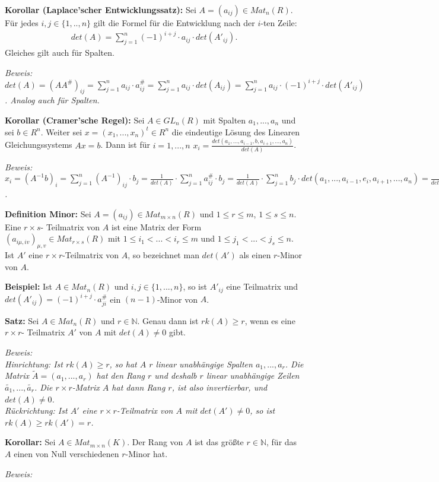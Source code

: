 \documentclass[11pt]{article}
\begin{document}
		\begin{mdframed}[backgroundcolor=blue!20]
			\textbf{Korollar (Laplace'scher Entwicklungssatz):} Sei $A=(a_{ij})\in Mat_n(R)$. Für jedes $i,j\in \{1,..,n\}$ gilt die 
			Formel für die Entwicklung nach der $i$-ten Zeile: \\
			\begin{align*}det(A)=\sum\limits_{j=1}^n (-1)^{i+j}\cdot a_{ij}\cdot det(A'_{ij}).\end{align*}
			Gleiches gilt auch für Spalten.
		\end{mdframed}
		\textit{Beweis: \\
		$det(A)=(AA^\#)_{ij}=\sum\limits_{j=1}^n a_{ij}\cdot a^\#_{ij} = \sum\limits_{j=1}^n a_{ij}\cdot det(A_{ij})=\sum\limits_
		{j=1}^n a_{ij}\cdot (-1)^{i+j}\cdot det(A'_{ij})$. Analog auch für Spalten.}
		
		\begin{mdframed}[backgroundcolor=blue!20]
			\textbf{Korollar (Cramer'sche Regel):} Sei $A\in GL_n(R)$ mit Spalten $a_1,...,a_n$ und sei $b\in R^n$. Weiter sei 
			$x=(x_1,...,x_n)^t\in R^n$ die eindeutige Lösung des Linearen Gleichungssystems $Ax=b$. Dann ist für $i=1,...,n$ 
			$x_i=\frac{det(a_1,...,a_{i-1},b,a_{i+1},...,a_n)}{det(A)}$.
		\end{mdframed}
		\textit{Beweis: \\
		$x_i=(A^{-1}b)_i=\sum\limits_{j=1}^n (A^{-1})_{ij}\cdot b_j=\frac{1}{det(A)}\cdot \sum\limits_{j=1}^n a^\#_{ij}\cdot b_j = 
		\frac{1}{det(A)}\cdot \sum\limits_{j=1}^n b_j\cdot det(a_1,...,a_{i-1},e_i,a_{i+1},...,a_n)=\frac{1}{det(A)}\cdot det(a_1,...,
		a_{i-1},b_j,a_{i+1},...,a_n)$.}
		
		\begin{mdframed}[backgroundcolor=blue!20]
			\textbf{Definition Minor:} Sei $A=(a_{ij})\in Mat_{m\times n}(R)$ und $1\le r \le m$, $1\le s \le n$. Eine $r\times s$-
			Teilmatrix von $A$ ist eine Matrix der Form $(a_{i\mu,iv})_{\mu,v}\in Mat_{r\times s}(R)$ mit $1\le i_1<...<i_r\le m$ 
			und $1\le j_1<...<j_s\le n$. Ist $A'$ eine $r\times r$-Teilmatrix von $A$, so bezeichnet man $det(A')$ als einen 
			$r$-Minor von $A$.
		\end{mdframed}
		
		\textbf{Beispiel:} Ist $A\in Mat_n(R)$ und $i,j\in \{1,...,n\}$, so ist $A'_{ij}$ eine Teilmatrix und $det(A'_{ij})=(-1)^{i+j}
		\cdot a^\#_{ji}$ ein $(n-1)$-Minor von $A$.
		
		\begin{framed}
			\textbf{Satz:} Sei $A\in Mat_n(R)$ und $r\in \mathbb N$. Genau dann ist $rk(A)\ge r$, wenn es eine $r\times r$-
			Teilmatrix $A'$ von $A$ mit $det(A)\neq 0$ gibt.
		\end{framed}
		\textit{Beweis: \\
		Hinrichtung: Ist $rk(A)\ge r$, so hat $A$ $r$ linear unabhängige Spalten $a_1,...,a_r$. Die Matrix $\tilde A=(a_1,...,a_r)$ 
		hat den Rang $r$ und deshalb $r$ linear unabhängige Zeilen $\tilde{a_1},...,\tilde{a_r}$. Die $r\times r$-Matrix $A$ hat 
		dann Rang $r$, ist also invertierbar, und $det(A)\neq 0$. \\
		Rückrichtung: Ist $A'$ eine $r\times r$-Teilmatrix von $A$ mit $det(A')\neq 0$, so ist $rk(A)\ge rk(A')=r$.}
		
		\begin{framed}
			\textbf{Korollar:} Sei $A\in Mat_{m\times n}(K)$. Der Rang von $A$ ist das größte $r\in \mathbb N$, für das 
			$A$ einen von Null verschiedenen $r$-Minor hat.
		\end{framed}
		\textit{Beweis: \\
		}
\end{document}
